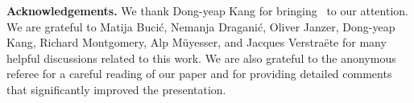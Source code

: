 \documentclass[10pt]{article}
\theoremstyle{plain}
\numberwithin{theorem}{section}
\theoremstyle{definition}
\theoremstyle{remark}
\theoremstyle{plain}
\begin{document}

\textbf{Acknowledgements.} We thank Dong-yeap Kang for bringing~\cite{kuhn2005packings} to our attention. 
We are grateful to Matija Buci\'c, Nemanja Dragani\'c, Oliver Janzer, Dong-yeap Kang, Richard Montgomery, 
Alp M\"uyesser, and Jacques Verstra\"ete for many helpful discussions related to this work. 
We are also grateful to the anonymous referee for a careful reading of our paper and for providing 
detailed comments that significantly improved the presentation.




\end{document}
